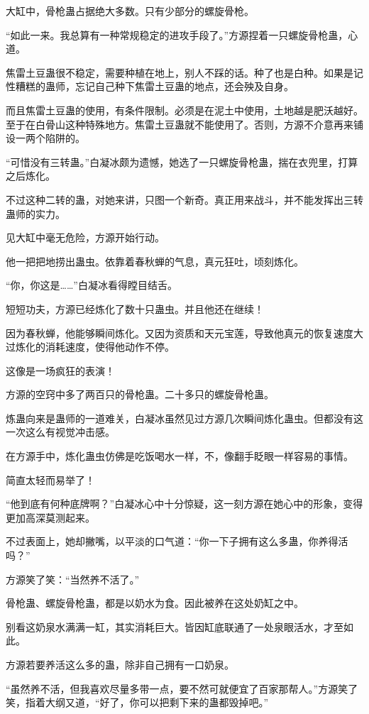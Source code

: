 \begin{this_body}
大缸中，骨枪蛊占据绝大多数。只有少部分的螺旋骨枪。

“如此一来。我总算有一种常规稳定的进攻手段了。”方源捏着一只螺旋骨枪蛊，心道。

焦雷土豆蛊很不稳定，需要种植在地上，别人不踩的话。种了也是白种。如果是记性糟糕的蛊师，忘记自己种下焦雷土豆蛊的地点，还会殃及自身。

而且焦雷土豆蛊的使用，有条件限制。必须是在泥土中使用，土地越是肥沃越好。至于在白骨山这种特殊地方。焦雷土豆蛊就不能使用了。否则，方源不介意再来铺设一两个陷阱的。

“可惜没有三转蛊。”白凝冰颇为遗憾，她选了一只螺旋骨枪蛊，揣在衣兜里，打算之后炼化。

不过这种二转的蛊，对她来讲，只图一个新奇。真正用来战斗，并不能发挥出三转蛊师的实力。

见大缸中毫无危险，方源开始行动。

他一把把地捞出蛊虫。依靠着春秋蝉的气息，真元狂吐，顷刻炼化。

“你，你这是……”白凝冰看得瞠目结舌。

短短功夫，方源已经炼化了数十只蛊虫。并且他还在继续！

因为春秋蝉，他能够瞬间炼化。又因为资质和天元宝莲，导致他真元的恢复速度大过炼化的消耗速度，使得他动作不停。

这像是一场疯狂的表演！

方源的空窍中多了两百只的骨枪蛊。二十多只的螺旋骨枪蛊。

炼蛊向来是蛊师的一道难关，白凝冰虽然见过方源几次瞬间炼化蛊虫。但都没有这一次这么有视觉冲击感。

在方源手中，炼化蛊虫仿佛是吃饭喝水一样，不，像翻手眨眼一样容易的事情。

简直太轻而易举了！

“他到底有何种底牌啊？”白凝冰心中十分惊疑，这一刻方源在她心中的形象，变得更加高深莫测起来。

不过表面上，她却撇嘴，以平淡的口气道：“你一下子拥有这么多蛊，你养得活吗？”

方源笑了笑：“当然养不活了。”

骨枪蛊、螺旋骨枪蛊，都是以奶水为食。因此被养在这处奶缸之中。

别看这奶泉水满满一缸，其实消耗巨大。皆因缸底联通了一处泉眼活水，才至如此。

方源若要养活这么多的蛊，除非自己拥有一口奶泉。

“虽然养不活，但我喜欢尽量多带一点，要不然可就便宜了百家那帮人。”方源笑了笑，指着大纲又道，“好了，你可以把剩下来的蛊都毁掉吧。”


\end{this_body}
